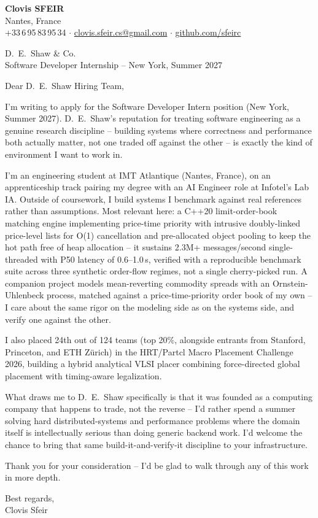 \documentclass[11pt]{article}
\begin{document}
\textbf{\large Clovis SFEIR} \\
Nantes, France \\
+33\,6\,95\,83\,95\,34 \;$\cdot$\; \href{mailto:clovis.sfeir.cs@gmail.com}{clovis.sfeir.cs@gmail.com} \;$\cdot$\; \href{https://github.com/sfeirc}{github.com/sfeirc}

\vspace{1.2em}
D.\ E.\ Shaw \& Co. \\
Software Developer Internship -- New York, Summer 2027

\vspace{1.2em}
Dear D.\ E.\ Shaw Hiring Team,

I'm writing to apply for the Software Developer Intern position (New York, Summer 2027). D.\ E.\ Shaw's reputation for treating software engineering as a genuine research discipline -- building systems where correctness and performance both actually matter, not one traded off against the other -- is exactly the kind of environment I want to work in.

I'm an engineering student at IMT Atlantique (Nantes, France), on an apprenticeship track pairing my degree with an AI Engineer role at Infotel's Lab IA. Outside of coursework, I build systems I benchmark against real references rather than assumptions. Most relevant here: a C++20 limit-order-book matching engine implementing price-time priority with intrusive doubly-linked price-level lists for O(1) cancellation and pre-allocated object pooling to keep the hot path free of heap allocation -- it sustains 2.3M+ messages/second single-threaded with P50 latency of 0.6--1.0\,\textmu s, verified with a reproducible benchmark suite across three synthetic order-flow regimes, not a single cherry-picked run. A companion project models mean-reverting commodity spreads with an Ornstein-Uhlenbeck process, matched against a price-time-priority order book of my own -- I care about the same rigor on the modeling side as on the systems side, and verify one against the other.

I also placed 24th out of 124 teams (top 20\%, alongside entrants from Stanford, Princeton, and ETH Z\"urich) in the HRT/Partcl Macro Placement Challenge 2026, building a hybrid analytical VLSI placer combining force-directed global placement with timing-aware legalization.

What draws me to D.\ E.\ Shaw specifically is that it was founded as a computing company that happens to trade, not the reverse -- I'd rather spend a summer solving hard distributed-systems and performance problems where the domain itself is intellectually serious than doing generic backend work. I'd welcome the chance to bring that same build-it-and-verify-it discipline to your infrastructure.

Thank you for your consideration -- I'd be glad to walk through any of this work in more depth.

\vspace{1em}
Best regards, \\
Clovis Sfeir
\end{document}
